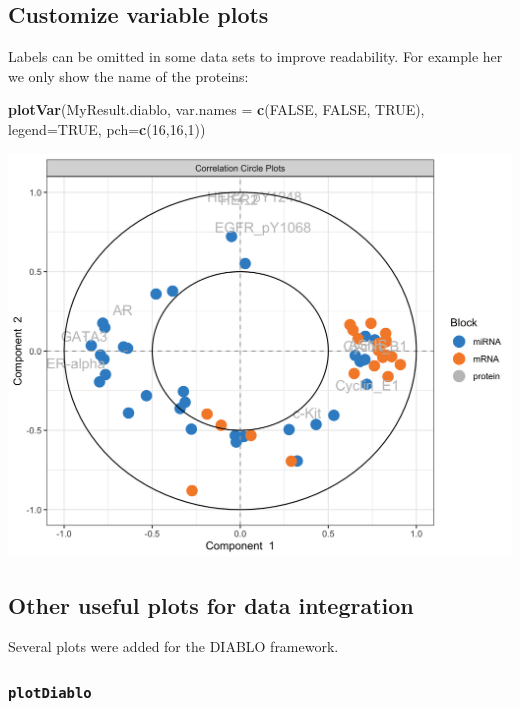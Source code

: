 \documentclass[]{book}
\newenvironment{Shaded}{\begin{snugshade}}{\end{snugshade}}
\newcommand{\DataTypeTok}[1]{\textcolor[rgb]{0.13,0.29,0.53}{#1}}
\newcommand{\DecValTok}[1]{\textcolor[rgb]{0.00,0.00,0.81}{#1}}
\newcommand{\KeywordTok}[1]{\textcolor[rgb]{0.13,0.29,0.53}{\textbf{#1}}}
\newcommand{\NormalTok}[1]{#1}
\newcommand{\OtherTok}[1]{\textcolor[rgb]{0.56,0.35,0.01}{#1}}
\begin{document}
\hypertarget{diablo:plotVar}{%
\subsection{Customize variable plots}\label{diablo:plotVar}}

Labels can be omitted in some data sets to improve readability. For example her we only show the name of the proteins:

\begin{Shaded}
\begin{Highlighting}[]
\KeywordTok{plotVar}\NormalTok{(MyResult.diablo, }\DataTypeTok{var.names =} \KeywordTok{c}\NormalTok{(}\OtherTok{FALSE}\NormalTok{, }\OtherTok{FALSE}\NormalTok{, }\OtherTok{TRUE}\NormalTok{),}
        \DataTypeTok{legend=}\OtherTok{TRUE}\NormalTok{, }\DataTypeTok{pch=}\KeywordTok{c}\NormalTok{(}\DecValTok{16}\NormalTok{,}\DecValTok{16}\NormalTok{,}\DecValTok{1}\NormalTok{))}
\end{Highlighting}
\end{Shaded}

\begin{center}\includegraphics[width=0.75\linewidth,]{Figures/06-diablo-plotVar-1} \end{center}

\hypertarget{other-useful-plots-for-data-integration-1}{%
\subsection{Other useful plots for data integration}\label{other-useful-plots-for-data-integration-1}}

Several plots were added for the DIABLO framework.

\hypertarget{plotdiablo}{%
\subsubsection{\texorpdfstring{\texttt{plotDiablo}}{plotDiablo}}\label{plotdiablo}}
\end{document}
